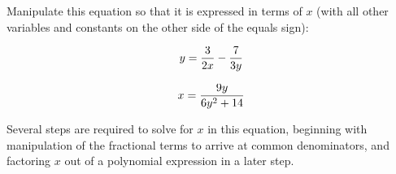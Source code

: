 

Manipulate this equation so that it is expressed in terms of $x$ (with all other variables and constants on the other side of the equals sign):

$$y = {3 \over 2x} - {7 \over 3y}$$







$$x = {9y \over {6y^2 + 14}}$$







Several steps are required to solve for $x$ in this equation, beginning with manipulation of the fractional terms to arrive at common denominators, and factoring $x$ out of a polynomial expression in a later step.




